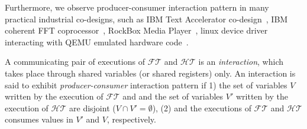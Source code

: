 \documentclass[sigconf]{acmart}
\begin{document}
Furthermore, we observe producer-consumer interaction pattern 
in many practical industrial co-designs, such as IBM 
Text Accelerator co-design~\cite{polig2014micro,polig2014fpl}, 
IBM coherent FFT coprocessor~\cite{giefers2015accelerating}, RockBox 
Media Player~\cite{hvc}, linux device driver interacting with QEMU emulated
hardware code~\cite{codes14}.  


%
A communicating pair of executions of 
$\mathcal{FT}$ and $\mathcal{HT}$ is an {\em interaction}, which 
takes place through shared variables (or shared registers)
only.  An interaction is said to exhibit {\em producer-consumer}
interaction pattern if 1) the set of variables $V$ written by 
the execution of $\mathcal{FT}$ and and the set of variables 
$V'$ written by the execution of $\mathcal{HT}$ are disjoint 
($V \cap V' = \emptyset$), (2) and the executions 
of $\mathcal{FT}$ and $\mathcal{HT}$ consumes values 
in $V'$ and $V$, respectively.
%
\end{document}
